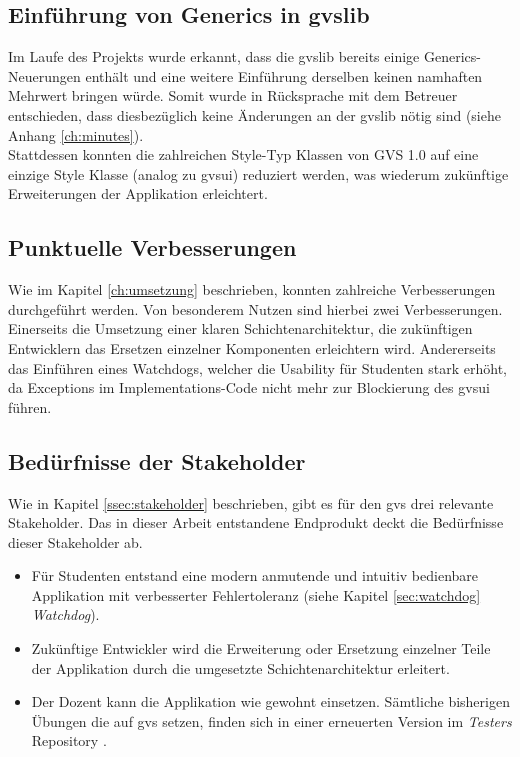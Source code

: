 \documentclass[11pt,a4paper,english,oneside]{book}
\numberwithin{equation}{chapter}
\begin{document}
	\subsection{Einführung von Generics in \gls{gvslib}}
	Im Laufe des Projekts wurde erkannt, dass die \gls{gvslib} bereits einige Generics-Neuerungen enthält und eine weitere Einführung derselben keinen namhaften Mehrwert bringen würde. Somit wurde in Rücksprache mit dem Betreuer entschieden, dass diesbezüglich keine Änderungen an der \gls{gvslib} nötig sind (siehe Anhang \ref{ch:minutes}).\\
	Stattdessen konnten die zahlreichen Style-Typ Klassen von GVS 1.0 auf eine einzige Style Klasse (analog zu \gls{gvsui}) reduziert werden, was wiederum zukünftige Erweiterungen der Applikation erleichtert.
	
	\subsection{Punktuelle Verbesserungen}
	Wie im Kapitel \ref{ch:umsetzung} beschrieben, konnten zahlreiche Verbesserungen durchgeführt werden. Von besonderem Nutzen sind hierbei zwei Verbesserungen. Einerseits die Umsetzung einer klaren Schichtenarchitektur, die zukünftigen Entwicklern das Ersetzen einzelner Komponenten erleichtern wird. Andererseits das Einführen eines Watchdogs, welcher die Usability für Studenten stark erhöht, da Exceptions im Implementations-Code nicht mehr zur Blockierung des \gls{gvsui} führen.
	
	\subsection{Bedürfnisse der Stakeholder}
	Wie in Kapitel \ref{ssec:stakeholder} beschrieben, gibt es für den \gls{gvs} drei relevante Stakeholder. Das in dieser Arbeit entstandene Endprodukt deckt die Bedürfnisse dieser Stakeholder ab.
	
	\begin{itemize}
		\item Für Studenten entstand eine modern anmutende und intuitiv bedienbare Applikation mit verbesserter Fehlertoleranz (siehe Kapitel \ref{sec:watchdog} \textit{Watchdog}).
		\item Zukünftige Entwickler wird die Erweiterung oder Ersetzung einzelner Teile der Applikation durch die umgesetzte Schichtenarchitektur erleitert.
		\item Der Dozent kann die Applikation wie gewohnt einsetzen. Sämtliche bisherigen Übungen die auf \gls{gvs} setzen, finden sich in einer erneuerten Version im \textit{Testers} Repository \cite{gvs-tester}.
	\end{itemize}
	
\end{document}
